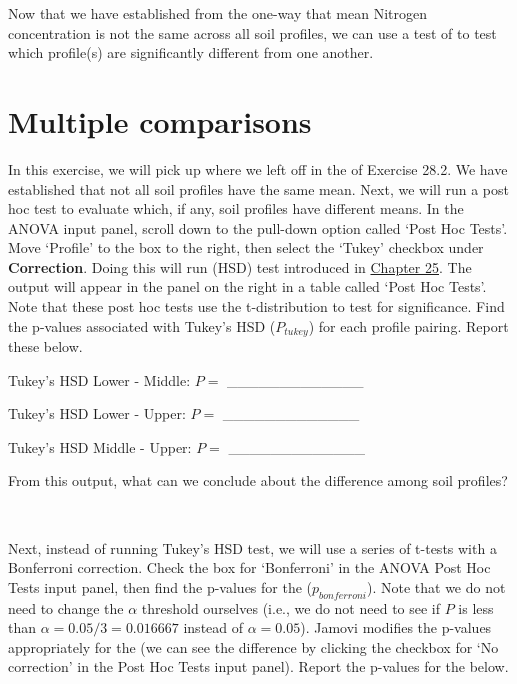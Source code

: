 \documentclass[
  openany]{krantz}
\begin{document}
Now that we have established from the one-way  that mean Nitrogen concentration is not the same across all soil profiles, we can use a test of  to test which profile(s) are significantly different from one another.

\hypertarget{multiple-comparisons}{%
\section{Multiple comparisons}\label{multiple-comparisons}}

In this exercise, we will pick up where we left off in the  of Exercise 28.2.
We have established that not all soil profiles have the same mean.
Next, we will run a post hoc  test to evaluate which, if any, soil profiles have different means.
In the ANOVA input panel, scroll down to the pull-down option called `Post Hoc Tests'.
Move `Profile' to the box to the right, then select the `Tukey' checkbox under \textbf{Correction}.
Doing this will run  (HSD) test introduced in \protect\hyperlink{Chapter_25}{Chapter 25}.
The output will appear in the panel on the right in a table called `Post Hoc Tests'.
Note that these post hoc tests use the t-distribution to test for significance.
Find the p-values associated with Tukey's HSD (\(P_{tukey}\)) for each profile pairing.
Report these below.

Tukey's HSD Lower - Middle: \(P =\) \_\_\_\_\_\_\_\_\_\_\_\_\_

Tukey's HSD Lower - Upper: \(P =\) \_\_\_\_\_\_\_\_\_\_\_\_\_

Tukey's HSD Middle - Upper: \(P =\) \_\_\_\_\_\_\_\_\_\_\_\_\_

From this output, what can we conclude about the difference among soil profiles?

\begin{verbatim}


\end{verbatim}

Next, instead of running Tukey's HSD test, we will use a series of t-tests with a Bonferroni correction.
Check the box for `Bonferroni' in the ANOVA Post Hoc Tests input panel, then find the p-values for the  (\(p_{bonferroni}\)).
Note that we do not need to change the \(\alpha\) threshold ourselves (i.e., we do not need to see if \(P\) is less than \(\alpha = 0.05/3 = 0.016667\) instead of \(\alpha = 0.05\)).
Jamovi modifies the p-values appropriately for the  (we can see the difference by clicking the checkbox for `No correction' in the Post Hoc Tests input panel).
Report the p-values for the  below.
\end{document}

